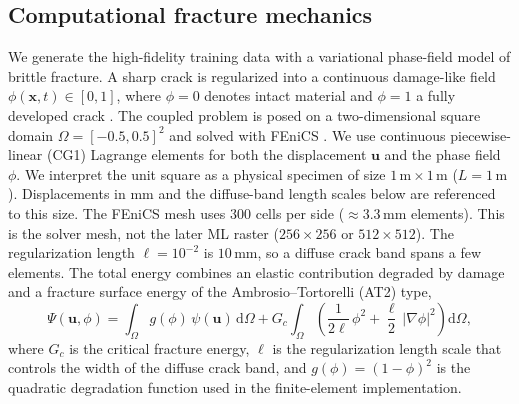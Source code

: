\documentclass[10pt]{article}
\theoremstyle{definition}
\begin{document}
\subsection{Computational fracture mechanics}

We generate the high-fidelity training data with a variational phase-field model of brittle fracture.
%
A sharp crack is regularized into a continuous damage-like field $\phi(\mathbf{x},t)\in[0,1]$, where $\phi=0$ denotes intact material and $\phi=1$ a fully developed crack \cite{francfort1998,miehe2010a}.
%
The coupled problem is posed on a two-dimensional square domain $\Omega=[-0.5,0.5]^2$ and solved with FEniCS \cite{fenics}.
%
We use continuous piecewise-linear (CG1) Lagrange elements for both the displacement $\mathbf{u}$ and the phase field $\phi$.
%
We interpret the unit square as a physical specimen of size $1\,\mathrm{m}\times1\,\mathrm{m}$ ($L=1\,\mathrm{m}$).
%
Displacements in mm and the diffuse-band length scales below are referenced to this size.
%
The FEniCS mesh uses $300$ cells per side ($\approx 3.3\,\mathrm{mm}$ elements).
%
This is the solver mesh, not the later ML raster ($256\times256$ or $512\times512$).
%
The regularization length $\ell=10^{-2}$ is $10\,\mathrm{mm}$, so a diffuse crack band spans a few elements.
%
The total energy combines an elastic contribution degraded by damage and a fracture surface energy of the Ambrosio--Tortorelli (AT2) type,
%
\begin{equation}
    \Psi(\mathbf{u},\phi)
    = \int_{\Omega} g(\phi)\,\psi(\mathbf{u})\,\mathrm{d}\Omega
    + G_c \int_{\Omega} \left( \frac{1}{2\ell}\,\phi^2 + \frac{\ell}{2}\,|\nabla\phi|^2 \right) \mathrm{d}\Omega ,
    \label{eq:total_energy}
\end{equation}
%
where $G_c$ is the critical fracture energy, $\ell$ is the regularization length scale that controls the width of the diffuse crack band, and $g(\phi)=(1-\phi)^2$ is the quadratic degradation function used in the finite-element implementation.
\end{document}
